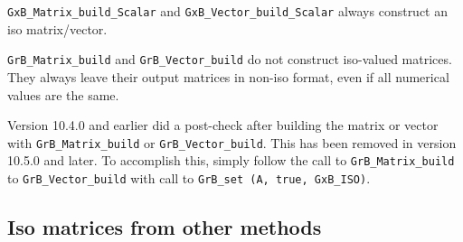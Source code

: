 \verb'GxB_Matrix_build_Scalar' and \verb'GxB_Vector_build_Scalar'
always construct an iso matrix/vector.

\verb'GrB_Matrix_build' and \verb'GrB_Vector_build'
do not construct iso-valued matrices.  They always leave their output matrices
in non-iso format, even if all numerical values are the same.

Version 10.4.0 and earlier did a post-check after building the matrix or
vector with \verb'GrB_Matrix_build' or \verb'GrB_Vector_build'.  This has been
removed in version 10.5.0 and later.  To accomplish this, simply follow the
call to \verb'GrB_Matrix_build' to \verb'GrB_Vector_build' with call to
\verb'GrB_set (A, true, GxB_ISO)'.


\subsection{Iso matrices from other methods}
\label{iso_other}

